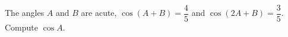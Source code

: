 The angles $A$ and $B$ are acute, $\cos(A+B)=\dfrac45$ and $\cos(2A+B)=\dfrac35$. Compute $\cos A$.
